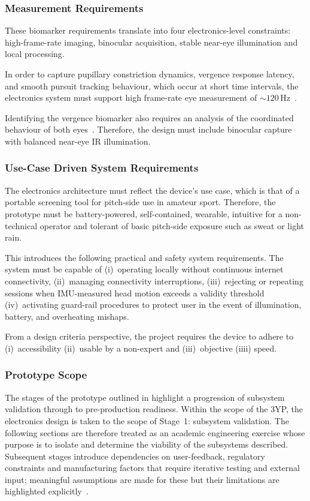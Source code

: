 \subsubsection{Measurement Requirements}

These biomarker requirements translate into four electronics-level constraints: high-frame-rate imaging, binocular acquisition, stable near-eye illumination and local processing.

In order to capture pupillary constriction dynamics, vergence response latency, and smooth pursuit tracking behaviour, which occur at short time intervals, the electronics system must support high frame-rate eye measurement of ${\sim}120$\,Hz~\cite{bergamin2003pupil}.

Identifying the vergence biomarker also requires an analysis of the coordinated behaviour of both eyes~\cite{yaramothu2019vergence}. Therefore, the design must include binocular capture with balanced near-eye IR illumination.

\subsubsection{Use-Case Driven System Requirements}

The electronics architecture must reflect the device's use case, which is that of a portable screening tool for pitch-side use in amateur sport. Therefore, the prototype must be battery-powered, self-contained, wearable, intuitive for a non-technical operator and tolerant of basic pitch-side exposure such as sweat or light rain.

This introduces the following practical and safety system requirements. The system must be capable of (i)~operating locally without continuous internet connectivity, (ii)~managing connectivity interruptions, (iii)~rejecting or repeating sessions when IMU-measured head motion exceeds a validity threshold (iv)~activating guard-rail procedures to protect user in the event of illumination, battery, and overheating mishaps.

From a design criteria perspective, the project requires the device to adhere to (i)~accessibility (ii)~usable by a non-expert and (iii)~objective (iiii) speed.

\subsubsection{Prototype Scope}

The stages of the prototype outlined in  highlight a progression of subsystem validation through to pre-production readiness. Within the scope of the 3YP, the electronics design is taken to the scope of Stage~1: subsystem validation. The following sections are therefore treated as an academic engineering exercise whose purpose is to isolate and determine the viability of the subsystems described. Subsequent stages introduce dependencies on user-feedback, regulatory constraints and manufacturing factors that require iterative testing and external input; meaningful assumptions are made for these but their limitations are highlighted explicitly~\cite{blanchard2011systems}.

